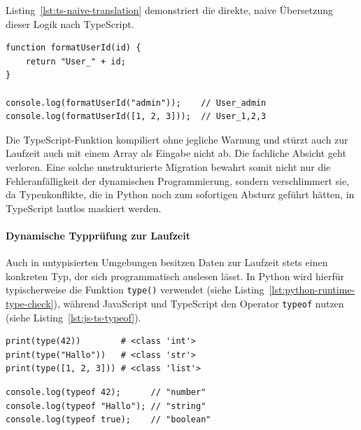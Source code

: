 Listing~\ref{lst:ts-naive-translation} demonstriert die direkte, naive Übersetzung dieser Logik nach TypeScript.

\begin{listing}[htbp]
    \caption{Naive Übersetzung nach TypeScript}
    \label{lst:ts-naive-translation}
    \begin{verbatim}
function formatUserId(id) {
    return "User_" + id;
}

console.log(formatUserId("admin"));    // User_admin
console.log(formatUserId([1, 2, 3]));  // User_1,2,3
    \end{verbatim}
\end{listing}

Die TypeScript-Funktion kompiliert ohne jegliche Warnung und stürzt auch zur Laufzeit auch mit einem Array als Eingabe nicht ab. Die fachliche Absicht geht verloren. Eine solche unstrukturierte Migration bewahrt somit nicht nur die Fehleranfälligkeit der dynamischen Programmierung, sondern verschlimmert sie, da Typenkonflikte, die in Python noch zum sofortigen Absturz geführt hätten, in TypeScript lautlos maskiert werden.

\paragraph{Dynamische Typprüfung zur Laufzeit}
\label{par:typen-zur-laufzeit-erkennen}

Auch in untypisierten Umgebungen besitzen Daten zur Laufzeit stets einen konkreten Typ, der sich programmatisch auslesen lässt. In Python wird hierfür typischerweise die Funktion \texttt{type()} verwendet (siehe Listing~\ref{lst:python-runtime-type-check}), während JavaScript und TypeScript den Operator \texttt{typeof} nutzen (siehe Listing~\ref{lst:js-ts-typeof}).

\begin{listing}[htbp]
    \caption{Typprüfung zur Laufzeit in Python}
    \label{lst:python-runtime-type-check}
    \begin{verbatim}
print(type(42))        # <class 'int'>
print(type("Hallo"))   # <class 'str'>
print(type([1, 2, 3])) # <class 'list'>
    \end{verbatim}
\end{listing}

\begin{listing}[htbp]
    \caption{Typprüfung zur Laufzeit in JavaScript und TypeScript}
    \label{lst:js-ts-typeof}
    \begin{verbatim}
console.log(typeof 42);      // "number"
console.log(typeof "Hallo"); // "string"
console.log(typeof true);    // "boolean"
    \end{verbatim}
\end{listing}


